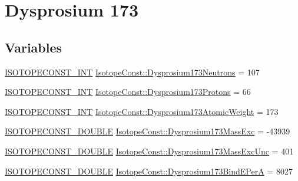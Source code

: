\hypertarget{group___isotope_const-_dysprosium-_dy173}{}\section{Dysprosium 173}
\label{group___isotope_const-_dysprosium-_dy173}
\subsection*{Variables}
\begin{DoxyCompactItemize}
\item 
\mbox{\hyperlink{group___isotope_const-_macros_ga5f18360b3e99483a35c32d789e62621c}{I\+S\+O\+T\+O\+P\+E\+C\+O\+N\+S\+T\+\_\+\+I\+NT}} \mbox{\hyperlink{group___isotope_const-_dysprosium-_dy173_ga75cd97f50be83aae0a3b3426ad298309}{Isotope\+Const\+::\+Dysprosium173\+Neutrons}} = 107
\item 
\mbox{\hyperlink{group___isotope_const-_macros_ga5f18360b3e99483a35c32d789e62621c}{I\+S\+O\+T\+O\+P\+E\+C\+O\+N\+S\+T\+\_\+\+I\+NT}} \mbox{\hyperlink{group___isotope_const-_dysprosium-_dy173_ga94c7bca4aaeb5d9ab8f4b36c00be7337}{Isotope\+Const\+::\+Dysprosium173\+Protons}} = 66
\item 
\mbox{\hyperlink{group___isotope_const-_macros_ga5f18360b3e99483a35c32d789e62621c}{I\+S\+O\+T\+O\+P\+E\+C\+O\+N\+S\+T\+\_\+\+I\+NT}} \mbox{\hyperlink{group___isotope_const-_dysprosium-_dy173_ga258c1bed9b6b1b40781d2ea8602ceaf4}{Isotope\+Const\+::\+Dysprosium173\+Atomic\+Weight}} = 173
\item 
\mbox{\hyperlink{group___isotope_const-_macros_ga8f45a7272ce02c0b4c65c44636ed719a}{I\+S\+O\+T\+O\+P\+E\+C\+O\+N\+S\+T\+\_\+\+D\+O\+U\+B\+LE}} \mbox{\hyperlink{group___isotope_const-_dysprosium-_dy173_ga3b027f1a0a8232a8fbc673824ff32a18}{Isotope\+Const\+::\+Dysprosium173\+Mass\+Exc}} = -\/43939
\item 
\mbox{\hyperlink{group___isotope_const-_macros_ga8f45a7272ce02c0b4c65c44636ed719a}{I\+S\+O\+T\+O\+P\+E\+C\+O\+N\+S\+T\+\_\+\+D\+O\+U\+B\+LE}} \mbox{\hyperlink{group___isotope_const-_dysprosium-_dy173_gabb93eb083d248d5bec428ba195c90f16}{Isotope\+Const\+::\+Dysprosium173\+Mass\+Exc\+Unc}} = 401
\item 
\mbox{\hyperlink{group___isotope_const-_macros_ga8f45a7272ce02c0b4c65c44636ed719a}{I\+S\+O\+T\+O\+P\+E\+C\+O\+N\+S\+T\+\_\+\+D\+O\+U\+B\+LE}} \mbox{\hyperlink{group___isotope_const-_dysprosium-_dy173_gafe2d247f83c4ff055f32ae992051769d}{Isotope\+Const\+::\+Dysprosium173\+Bind\+E\+PerA}} = 8027
\item 

\end{DoxyCompactItemize}
